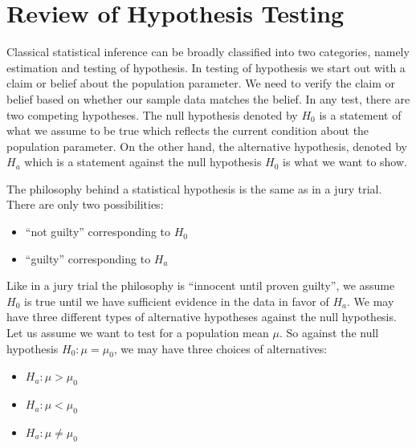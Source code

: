 %


\section{Review of Hypothesis Testing}

Classical statistical inference can be broadly classified into two categories, namely estimation and testing of hypothesis. In testing of hypothesis we start out with a claim or belief about the population parameter. We need to verify the claim or belief based on whether our sample data matches the belief. In any test, there are two competing hypotheses. The null hypothesis denoted by $H_0$ is a statement of what we assume to be true which reflects the current condition about the population parameter. On the other hand, the alternative hypothesis, denoted by $H_a$ which is a statement against the null hypothesis $H_0$ is what we want to show. 

The philosophy behind a statistical hypothesis is the same as in a jury trial. There are only two possibilities:

\begin{itemize} \itemsep 0in
\item ``not guilty'' corresponding to $H_0$
\item ``guilty'' corresponding to $H_a$ 
\end{itemize}

Like in a jury trial the philosophy is ``innocent until proven guilty'', we assume $H_0$ is true until we have sufficient evidence in the data in favor of $H_a$. 
We may have three different types of alternative hypotheses against the null hypothesis. Let us assume we want to test for a population mean $\mu$. So against the null hypothesis $H_0: \mu = \mu_0$, we may have three choices of alternatives:

\begin{itemize} \itemsep 0in
\item $H_a: \mu > \mu_0$
\item $H_a: \mu < \mu_0$ 
\item $H_a: \mu \ne \mu_0$
\end{itemize}

